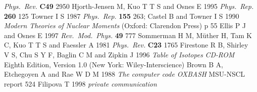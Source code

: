 \documentclass[12pt]{iopart}
\begin{document}
\begin{thebibliography}{99}
        {\em Phys.\ Rev.} {\bf C49} 2950
 Hjorth-Jensen M, Kuo T T S and Osnes E 1995 {\em Phys.\ Rep.}
        {\bf 260} 125
 Towner I S 1987 {\em Phys.\ Rep.} {\bf 155} 263; Castel B
        and Towner I S 1990 {\em Modern Theories
        of Nuclear Moments} (Oxford: Clarendon Press) p 55
 Ellis P J and Osnes E 1997 {\em Rev.\ Mod.\ Phys.} {\bf 49} 777
 Sommerman H M, M\"uther H,
        Tam K C, Kuo T T S and Faessler A 1981 {\em Phys.\ Rev.} {\bf C23} 1765
 Firestone R B, Shirley V S, Chu S Y F,
        Baglin C M and Zipkin J 1996 {\em Table of Isotopes CD-ROM} Eighth Edition,
        Version 1.0 (New York: Wiley-Interscience)
 Brown B A, Etchegoyen A and Rae W D M 1988
        {\em The computer code OXBASH} MSU-NSCL report 524
 Filipova T 1998 {\em private communication}
\end{thebibliography}
\end{document}
